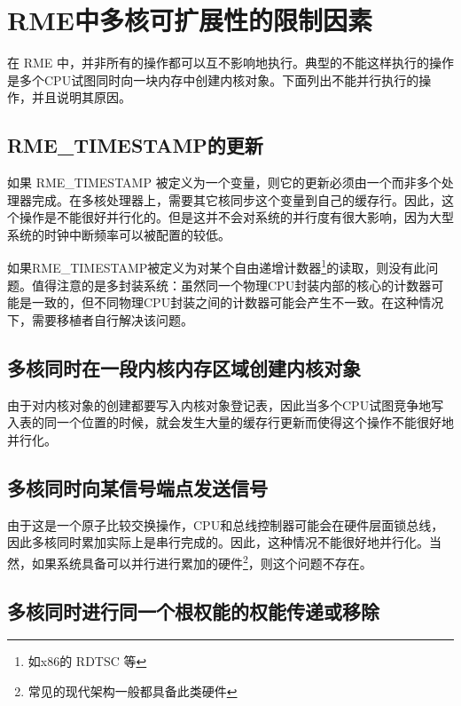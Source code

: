 \section{RME中多核可扩展性的限制因素}\label{sec:9-multicore-scalability-limits}

在 RME 中，并非所有的操作都可以互不影响地执行。典型的不能这样执行的操作是多个CPU试图同时向一块内存中创建内核对象。下面列出不能并行执行的操作，并且说明其原因。

\subsection{RME\_TIMESTAMP的更新}\label{subsec:9-timestamp-update}

如果 RME\_TIMESTAMP 被定义为一个变量，则它的更新必须由一个而非多个处理器完成。在多核处理器上，需要其它核同步这个变量到自己的缓存行。因此，这个操作是不能很好并行化的。但是这并不会对系统的并行度有很大影响，因为大型系统的时钟中断频率可以被配置的较低。

如果RME\_TIMESTAMP被定义为对某个自由递增计数器\footnote{如x86的 RDTSC 等}的读取，则没有此问题。值得注意的是多封装系统：虽然同一个物理CPU封装内部的核心的计数器可能是一致的，但不同物理CPU封装之间的计数器可能会产生不一致。在这种情况下，需要移植者自行解决该问题。

\subsection{多核同时在一段内核内存区域创建内核对象}\label{subsec:9-concurrent-kernel-object-creation}

由于对内核对象的创建都要写入内核对象登记表，因此当多个CPU试图竞争地写入表的同一个位置的时候，就会发生大量的缓存行更新而使得这个操作不能很好地并行化。

\subsection{多核同时向某信号端点发送信号}\label{subsec:9-concurrent-signal-sending}

由于这是一个原子比较交换操作，CPU和总线控制器可能会在硬件层面锁总线，因此多核同时累加实际上是串行完成的。因此，这种情况不能很好地并行化。当然，如果系统具备可以并行进行累加的硬件\footnote{常见的现代架构一般都具备此类硬件}，则这个问题不存在。

\subsection{多核同时进行同一个根权能的权能传递或移除}\label{subsec:9-concurrent-root-capability-transfer}


